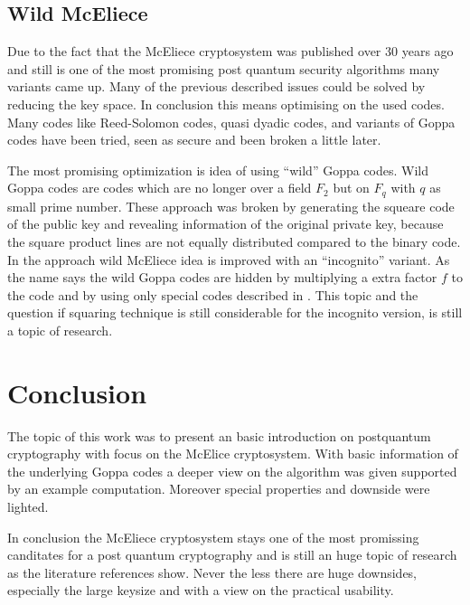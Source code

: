 \subsection*{Wild McEliece} %
Due to the fact that the McEliece cryptosystem was published over 30 years ago and still is one of the most promising post quantum security algorithms many variants came up. Many of the previous described issues could be solved by reducing the key space. In conclusion this means optimising on the used codes. Many codes like Reed-Solomon codes, quasi dyadic codes, and variants of Goppa codes have been tried, seen as secure and been broken a little later. 

The most promising optimization is idea of using ``wild'' Goppa codes\cite{bernstein2010wild}. Wild Goppa codes are codes which are no longer over a field $F_2$ but on $F_q$ with $q$ as small prime number. These approach was broken by generating the squeare code of the public key and revealing information of the original private key, because the square product lines are not equally distributed compared to the binary code. In \cite{yang2011post} the approach wild McEliece idea is improved with an ``incognito'' variant. As the name says the wild Goppa codes are hidden by multiplying a extra factor $f$ to the code and by using only special codes described in \cite{berger2005mask}. This topic and the question if squaring technique is still considerable for the incognito version, is still a topic of research. 



\section{Conclusion}
The topic of this work was to present an basic introduction on postquantum cryptography with focus on the McElice cryptosystem. With basic information of the underlying Goppa codes a deeper view on the algorithm was given supported by an example computation. Moreover special properties and downside were lighted. 

In conclusion the McEliece cryptosystem stays one of the most promissing canditates for a post quantum cryptography and is still an huge topic of research as the literature references show. Never the less there are huge downsides, especially the large keysize and with a view on the practical usability. 
